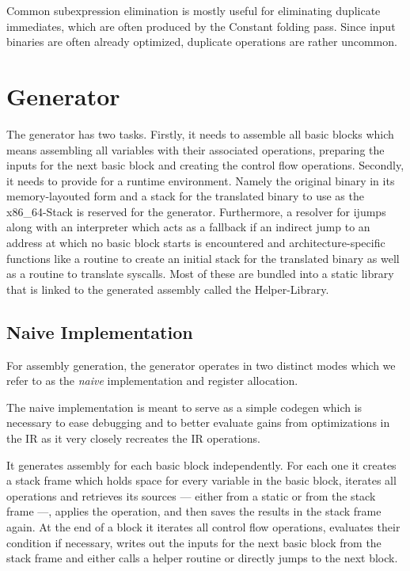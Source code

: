 \documentclass[course=eragp]{aspdoc}
\begin{document}
Common subexpression elimination is mostly useful for eliminating duplicate immediates, which are often produced by
the Constant folding pass. Since input binaries are often already optimized, duplicate operations are rather uncommon.


\section{Generator}\label{sec:generator}
The generator has two tasks.
Firstly, it needs to assemble all basic blocks which means assembling all variables with their associated operations,
preparing the inputs for the next basic block and creating the control flow operations.
Secondly, it needs to provide for a runtime environment. Namely the original binary in its memory-layouted
form and a stack for the translated binary to use as the x86\_64-Stack is reserved for the
generator. Furthermore, a resolver for ijumps
along with an interpreter which acts as a fallback if an indirect jump to an address at which no basic block starts is encountered
and architecture-specific functions like a routine to create an initial stack for the translated binary as well as a routine to translate syscalls.
Most of these are bundled into a static library that is linked to the generated assembly called the
Helper-Library.

\subsection{Naive Implementation}\label{naive_generator}

For assembly generation, the generator operates in two distinct modes which we refer to as the
\textit{naive} implementation and register allocation.

\par

The naive implementation is meant to serve as a simple codegen which is necessary to ease debugging
and to better evaluate gains from
optimizations in the IR as it very closely recreates the IR operations.

\par

It generates assembly for each basic block independently.
For each one it creates a stack frame which holds space for every variable in the basic block, iterates all operations and
retrieves its sources  --- either from a static or from the stack frame  ---, applies the operation, and then saves the results in the stack frame again.
At the end of a block it iterates all control flow operations, evaluates their condition if necessary, writes out the inputs for the next basic block
from the stack frame and either calls a helper routine or directly jumps to the next block.
\end{document}
